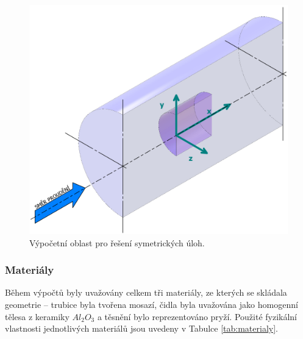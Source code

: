             \begin{figure}[ht!]
                \centering
                \includegraphics[width=\textwidth]{300_VYPOCETNI_MODEL/Vypocetni_oblast_symetrie.png}
                \caption{Výpočetní oblast pro řešení symetrických úloh.}
                \label{fig:vypocetni-oblast-symetrie}
            \end{figure}
         
	\newpage
        \subsubsection{Materiály} \label{sec:materialy}
            Během výpočtů byly uvažovány celkem tři materiály, ze kterých se skládala geometrie – trubice byla tvořena mosazí, čidla byla uvažována jako homogenní tělesa z keramiky $Al_2 O_3$ a těsnění bylo reprezentováno pryží. Použité fyzikální vlastnosti jednotlivých materiálů jsou uvedeny v Tabulce \ref{tab:materialy}.
            
